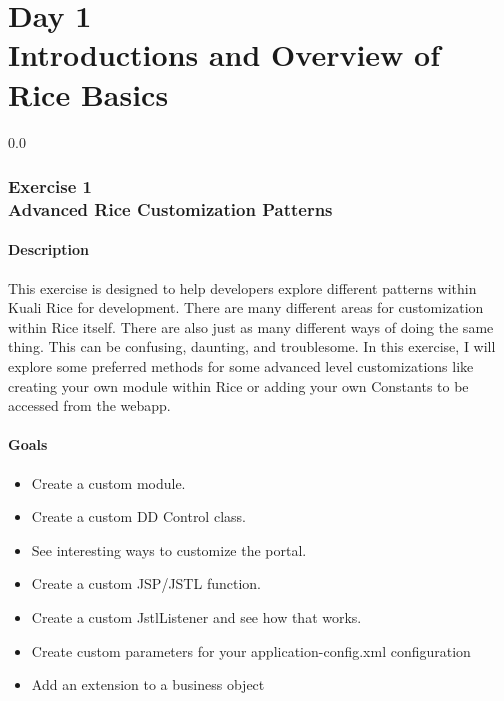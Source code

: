 \part*{Day 1\\
Introductions and Overview of Rice Basics}
{}
{\setlength{\baselineskip}%
  {0.0\baselineskip}
  \section*{\flushright Exercise 1\\Advanced Rice Customization Patterns}
  \hrulefill \par}

\subsection*{Description}
This exercise is designed to help developers explore different
patterns within Kuali Rice for development. There are many different
areas for customization within Rice itself. There are also just as
many different ways of doing the same thing. This can be confusing,
daunting, and troublesome. In this exercise, I will explore some
preferred methods for some advanced level customizations like creating
your own module within Rice or adding your own Constants to be
accessed from the webapp.
\subsection*{Goals}
\begin{itemize}
  \item Create a custom module.
  \item Create a custom DD Control class.
  \item See interesting ways to customize the portal.
  \item Create a custom JSP/JSTL function.
  \item Create a custom JstlListener and see how that works.
  \item Create custom parameters for your application-config.xml
    configuration
  \item Add an extension to a business object
\end{itemize}

